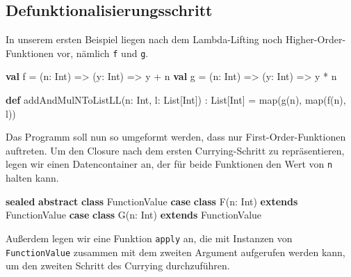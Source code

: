 \documentclass[]{article}
\newenvironment{Shaded}{}{}
\newcommand{\FunctionTok}[1]{\textcolor[rgb]{0.02,0.16,0.49}{#1}}
\newcommand{\KeywordTok}[1]{\textcolor[rgb]{0.00,0.44,0.13}{\textbf{#1}}}
\newcommand{\NormalTok}[1]{#1}
\begin{document}
\hypertarget{defunktionalisierungsschritt}{%
\subsection{Defunktionalisierungsschritt}\label{defunktionalisierungsschritt}}

In unserem ersten Beispiel liegen nach dem Lambda-Lifting noch
Higher-Order-Funktionen vor, nämlich \texttt{f} und \texttt{g}.

\begin{Shaded}
\begin{Highlighting}[]
\KeywordTok{val}\NormalTok{ f = (n: Int) =\textgreater{} (y: Int) =\textgreater{} y + n}
\KeywordTok{val}\NormalTok{ g = (n: Int) =\textgreater{} (y: Int) =\textgreater{} y * n}

\KeywordTok{def} \FunctionTok{addAndMulNToListLL}\NormalTok{(n: Int, l: List[Int]) : List[Int] =}
  \FunctionTok{map}\NormalTok{(}\FunctionTok{g}\NormalTok{(n), }\FunctionTok{map}\NormalTok{(}\FunctionTok{f}\NormalTok{(n), l))}
\end{Highlighting}
\end{Shaded}

Das Programm soll nun so umgeformt werden, dass nur
First-Order-Funktionen auftreten. Um den Closure nach dem ersten
Currying-Schritt zu repräsentieren, legen wir einen Datencontainer an,
der für beide Funktionen den Wert von \texttt{n} halten kann.

\begin{Shaded}
\begin{Highlighting}[]
\KeywordTok{sealed} \KeywordTok{abstract} \KeywordTok{class}\NormalTok{ FunctionValue}
\KeywordTok{case} \KeywordTok{class} \FunctionTok{F}\NormalTok{(n: Int) }\KeywordTok{extends}\NormalTok{ FunctionValue}
\KeywordTok{case} \KeywordTok{class} \FunctionTok{G}\NormalTok{(n: Int) }\KeywordTok{extends}\NormalTok{ FunctionValue}
\end{Highlighting}
\end{Shaded}

Außerdem legen wir eine Funktion \texttt{apply} an, die mit Instanzen
von \texttt{FunctionValue} zusammen mit dem zweiten Argument aufgerufen
werden kann, um den zweiten Schritt des Currying durchzuführen.
\end{document}
